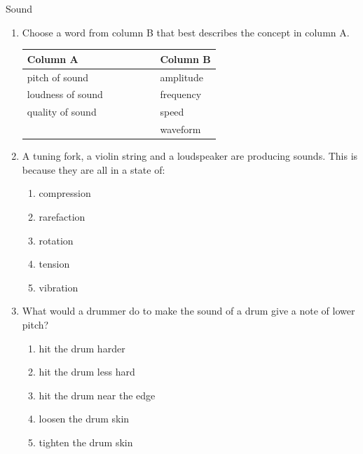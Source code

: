 \begin{eocexercises}{Sound}
            \nopagebreak
      \label{m38800*id185882}\begin{enumerate}[noitemsep, label=\textbf{\arabic*}. ] 
            \label{m38800*uid27}\item Choose a word from column B that best describes the concept in column A.
          \begin{center}
\begin{tabular}{ll}
\textbf{Column A} & \textbf{Column B} \\ \hline
pitch of sound \ \ \ & amplitude \\
loudness of sound \ \ \ \ \ \ \ \ \ & frequency \\
quality of sound \ \ \ & speed \\
& waveform \\
\end{tabular}
\end{center}
    \par
          \label{m38800*uid28}\item A tuning fork, a violin string and a loudspeaker are producing sounds. This is because they are all in a state of:
\label{m38800*id185988}\begin{enumerate}[noitemsep, label=\textbf{\alph*}. ] 
            \label{m38800*uid29}\item compression
\label{m38800*uid30}\item rarefaction
\label{m38800*uid31}\item rotation
\label{m38800*uid32}\item tension
\label{m38800*uid33}\item vibration
\end{enumerate}
                \label{m38800*uid34}\item What would a drummer do to make the sound of a drum give a note of lower pitch?
\label{m38800*id186066}\begin{enumerate}[noitemsep, label=\textbf{\alph*}. ] 
            \label{m38800*uid35}\item hit the drum harder
\label{m38800*uid36}\item hit the drum less hard
\label{m38800*uid37}\item hit the drum near the edge
\label{m38800*uid38}\item loosen the drum skin
\label{m38800*uid39}\item tighten the drum skin

\end{enumerate}
\end{enumerate}
\end{eocexercises}

